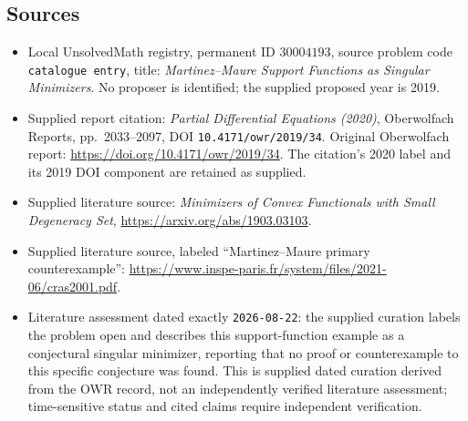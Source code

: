 \documentclass[11pt]{article}
\begin{document}
\subsection{Sources}
\begin{itemize}
\item Local UnsolvedMath registry, permanent ID \(30004193\), source problem code \texttt{catalogue entry}, title: \emph{Martinez--Maure Support Functions as Singular Minimizers}. No proposer is identified; the supplied proposed year is 2019.
\item Supplied report citation: \emph{Partial Differential Equations (2020)}, Oberwolfach Reports, pp.~2033--2097, DOI \texttt{10.4171/owr/2019/34}. Original Oberwolfach report: \url{https://doi.org/10.4171/owr/2019/34}. The citation's 2020 label and its 2019 DOI component are retained as supplied.
\item Supplied literature source: \emph{Minimizers of Convex Functionals with Small Degeneracy Set}, \url{https://arxiv.org/abs/1903.03103}.
\item Supplied literature source, labeled ``Martinez--Maure primary counterexample'': \url{https://www.inspe-paris.fr/system/files/2021-06/cras2001.pdf}.
\item Literature assessment dated exactly \texttt{2026-08-22}: the supplied curation labels the problem open and describes this support-function example as a conjectural singular minimizer, reporting that no proof or counterexample to this specific conjecture was found. This is supplied dated curation derived from the OWR record, not an independently verified literature assessment; time-sensitive status and cited claims require independent verification.
\end{itemize}
\end{document}
